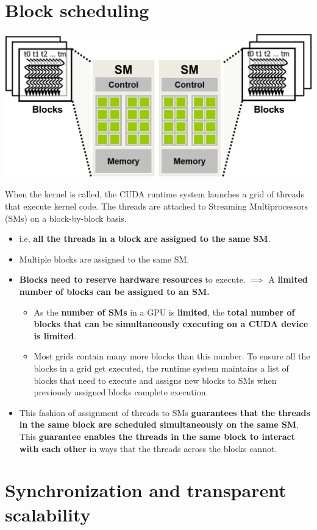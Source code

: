 \section{Block scheduling}
\begin{center}
    \includegraphics[width=0.7\linewidth]{Images/CompArch/block_assignment.png}
\end{center}
When the kernel is called, the CUDA runtime system launches a grid of threads that execute kernel code. The threads are attached to Streaming Multiprocessors (SMs) on a block-by-block basis.
\begin{itemize}
    \item i.e, \textbf{all the threads in a block are assigned to the same SM}.
    \item Multiple blocks are assigned to the same SM.
    \item \textbf{Blocks need to reserve hardware resources} to execute. $\implies$ A \textbf{limited number of blocks can be assigned to an SM.}
          \begin{itemize}
              \item As the \textbf{number of SMs} in a GPU is \textbf{limited}, the \textbf{total number of blocks that can be simultaneously executing on a CUDA device is limited}.
              \item Most grids contain many more blocks than this number. To ensure all the blocks in a grid get executed, the runtime system maintains a list of blocks that need to execute and assigns new blocks to SMs when previously assigned blocks complete execution.
          \end{itemize}
    \item This fashion of assignment of threads to SMs \textbf{guarantees that the threads in the same block are scheduled simultaneously on the same SM}. This \textbf{guarantee enables the threads in the same block to interact with each other} in ways that the threads across the blocks cannot.
\end{itemize}

\section{Synchronization and transparent scalability}
